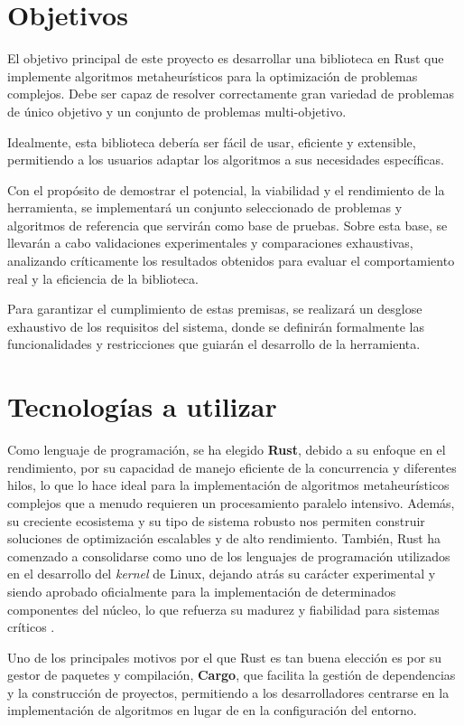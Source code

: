 \documentclass[12pt,a4paper,twoside,openright]{book}
\begin{document}
\section{Objetivos}
    El objetivo principal de este proyecto es desarrollar una biblioteca en Rust que implemente algoritmos metaheurísticos para la optimización de problemas complejos. Debe ser capaz de resolver correctamente gran variedad de problemas de único objetivo y un conjunto de problemas multi-objetivo. 
    
    Idealmente, esta biblioteca debería ser fácil de usar, eficiente y extensible, permitiendo a los usuarios adaptar los algoritmos a sus necesidades específicas. 

    Con el propósito de demostrar el potencial, la viabilidad y el rendimiento de la herramienta, se implementará un conjunto seleccionado de problemas y algoritmos de referencia que servirán como base de pruebas. Sobre esta base, se llevarán a cabo validaciones experimentales y comparaciones exhaustivas, analizando críticamente los resultados obtenidos para evaluar el comportamiento real y la eficiencia de la biblioteca.
    
    Para garantizar el cumplimiento de estas premisas, se realizará un desglose exhaustivo de los requisitos del sistema, donde se definirán formalmente las funcionalidades y restricciones que guiarán el desarrollo de la herramienta.

\section{Tecnologías a utilizar}
    \label{sec:tecnologías-herramientas}
    Como lenguaje de programación, se ha elegido \textbf{Rust}, debido a su enfoque en el rendimiento, por su capacidad de manejo eficiente de la concurrencia y diferentes hilos, lo que lo hace ideal para la implementación de algoritmos metaheurísticos complejos que a menudo requieren un procesamiento paralelo intensivo.
    Además, su creciente ecosistema y su tipo de sistema robusto nos permiten construir soluciones de optimización escalables y de alto rendimiento.
    También, Rust ha comenzado a consolidarse como uno de los lenguajes de programación utilizados en el desarrollo del \emph{kernel} de Linux, dejando atrás su carácter experimental y siendo aprobado oficialmente para la implementación de determinados componentes del núcleo, lo que refuerza su madurez y fiabilidad para sistemas críticos \cite{leemhuis2025rustlinux}.   
    
    Uno de los principales motivos por el que Rust es tan buena elección es por su gestor de paquetes y compilación, \textbf{Cargo}, que facilita la gestión de dependencias y la construcción de proyectos, permitiendo a los desarrolladores centrarse en la implementación de algoritmos en lugar de en la configuración del entorno.
    
\end{document}
